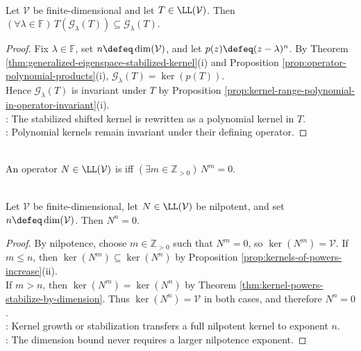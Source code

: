 \begin{proposition} \label{prop:generalized-eigenspaces-invariant} \\
Let $\mathcal{V}$ be finite-dimensional and let $T\in\LL(\mathcal{V})$. Then $(\forall\lambda\in\mathbb{F})\,T(\mathcal{G}_{\lambda}(T))\subseteq\mathcal{G}_{\lambda}(T)$.
\begin{proof}
Fix $\lambda\in\mathbb{F}$, set $n\defeq\dim(\mathcal{V})$, and let $p(z)\defeq(z-\lambda)^n$. By Theorem \ref{thm:generalized-eigenspace-stabilized-kernel}(i) and Proposition \ref{prop:operator-polynomial-products}(i), $\mathcal{G}_{\lambda}(T)=\ker(p(T))$.\\
Hence $\mathcal{G}_{\lambda}(T)$ is invariant under $T$ by Proposition \ref{prop:kernel-range-polynomial-in-operator-invariant}(i).\\
: The stabilized shifted kernel is rewritten as a polynomial kernel in $T$.\\
: Polynomial kernels remain invariant under their defining operator.
\end{proof}
\end{proposition}

\begin{definition} \label{def:nilpotent-operator} \\
An operator $N\in\LL(\mathcal{V})$ is  iff $(\exists m\in\mathbb{Z}_{>0})\,N^m=0$.
\end{definition}

\begin{corollary} \label{cor:nilpotent-power-dimension-zero} \\
Let $\mathcal{V}$ be finite-dimensional, let $N\in\LL(\mathcal{V})$ be nilpotent, and set $n\defeq\dim(\mathcal{V})$. Then $N^n=0$.
\begin{proof}
By nilpotence, choose $m\in\mathbb{Z}_{>0}$ such that $N^m=0$, so $\ker(N^m)=\mathcal{V}$. If $m\leq n$, then $\ker(N^m)\subseteq\ker(N^n)$ by Proposition \ref{prop:kernels-of-powers-increase}(ii).\\
If $m>n$, then $\ker(N^m)=\ker(N^n)$ by Theorem \ref{thm:kernel-powers-stabilize-by-dimension}. Thus $\ker(N^n)=\mathcal{V}$ in both cases, and therefore $N^n=0$.\\
: Kernel growth or stabilization transfers a full nilpotent kernel to exponent $n$.\\
: The dimension bound never requires a larger nilpotence exponent.
\end{proof}
\end{corollary}

